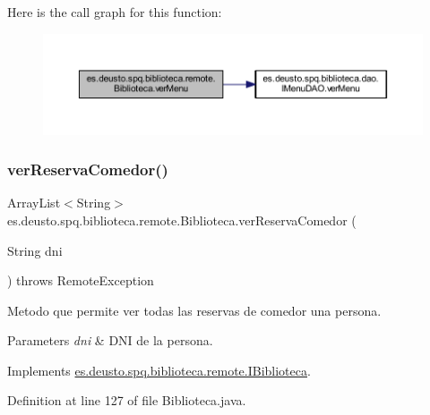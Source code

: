 Here is the call graph for this function\+:
\nopagebreak
\begin{figure}[H]
\begin{center}
\leavevmode
\includegraphics[width=350pt]{classes_1_1deusto_1_1spq_1_1biblioteca_1_1remote_1_1_biblioteca_ad964168fdca53a12ab747247617f41c7_cgraph}
\end{center}
\end{figure}
\mbox{\label{classes_1_1deusto_1_1spq_1_1biblioteca_1_1remote_1_1_biblioteca_a4bbd6c5f2df8f41fd0b5fb61564a1bfd}} 
\subsubsection{\texorpdfstring{ver\+Reserva\+Comedor()}{verReservaComedor()}}
{\footnotesize\ttfamily Array\+List$<$String$>$ es.\+deusto.\+spq.\+biblioteca.\+remote.\+Biblioteca.\+ver\+Reserva\+Comedor (\begin{DoxyParamCaption}\item[{String}]{dni }\end{DoxyParamCaption}) throws Remote\+Exception}

Metodo que permite ver todas las reservas de comedor una persona. 
\begin{DoxyParams}{Parameters}
{\em dni} & D\+NI de la persona. \\
\hline
\end{DoxyParams}


Implements \mbox{\hyperlink{interfacees_1_1deusto_1_1spq_1_1biblioteca_1_1remote_1_1_i_biblioteca_a95f0223ecd802f703977d838c72a93bf}{es.\+deusto.\+spq.\+biblioteca.\+remote.\+I\+Biblioteca}}.



Definition at line 127 of file Biblioteca.\+java.

